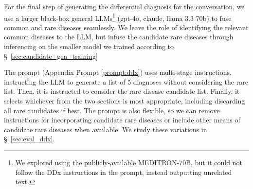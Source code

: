 For the final step of generating the differential diagnosis for the conversation,  we use a larger black-box general LLMs\footnote{We explored using the publicly-available MEDITRON-70B\cite{chen2023meditron70bscalingmedicalpretraining}, but it could not follow the DDx instructions in the prompt, instead outputting unrelated text.} (gpt-4o, claude, llama 3.3 70b) to fuse common and rare diseases seamlessly. We leave the role of identifying the relevant common diseases to the LLM, but infuse the candidate rare diseases through inferencing on the smaller model we trained according to \S~\ref{sec:candidate_gen_training}

The prompt (Appendix Prompt \ref{prompt:ddx})  uses multi-stage instructions, instructing the LLM to generate a list of 5 diagnoses without considering the rare list.  Then, it is instructed to consider the rare disease candidate list. Finally, it selects whichever from the two sections is most appropriate, including discarding all rare candidates if best. The prompt is also flexible, so we can remove instructions for incorporating candidate rare diseases or include other means of candidate rare diseases when available. We study these variations in \S~\ref{sec:eval_ddx}.
